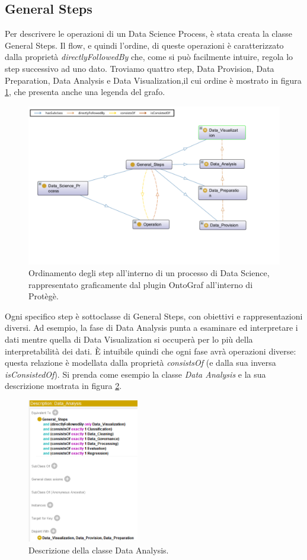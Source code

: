 \subsection{General Steps}
Per descrivere le operazioni di un Data Science Process, è stata creata la classe General Steps. Il flow, e quindi l'ordine, di queste operazioni è caratterizzato dalla proprietà \textit{directlyFollowedBy} che, come si può facilmente intuire, regola lo step successivo ad uno dato. Troviamo quattro step, Data Provision, Data Preparation, Data Analysis e Data Visualization,il cui ordine è mostrato in figura \ref{fig:hasSubclass}, che presenta anche una legenda del grafo.
\begin{figure}[H]
    \centering
    \includegraphics[width=12cm]{docs/images/hasSubclass.png}
    \caption{Ordinamento degli step all'interno di un processo di Data Science, rappresentato graficamente dal plugin OntoGraf all'interno di Protègè.}
    \label{fig:hasSubclass}
\end{figure}

Ogni specifico step è sottoclasse di General Steps, con obiettivi e rappresentazioni diversi. Ad esempio, la fase di Data Analysis punta a esaminare ed interpretare i dati mentre quella di Data Visualization si occuperà per lo più della interpretabilità dei dati. È intuibile quindi che ogni fase avrà operazioni diverse: questa relazione è modellata dalla proprietà \textit{consistsOf} (e dalla sua inversa \textit{isConsistedOf}). Si prenda come esempio la classe \textit{Data Analysis} e la sua descrizione mostrata in figura \ref{fig:data_anal}.
\begin{figure}[H]
    \centering
    \includegraphics[height=6.3cm]{docs/images/datanaldesc.PNG}
    \caption{Descrizione della classe Data Analysis.}
    \label{fig:data_anal}
\end{figure}

